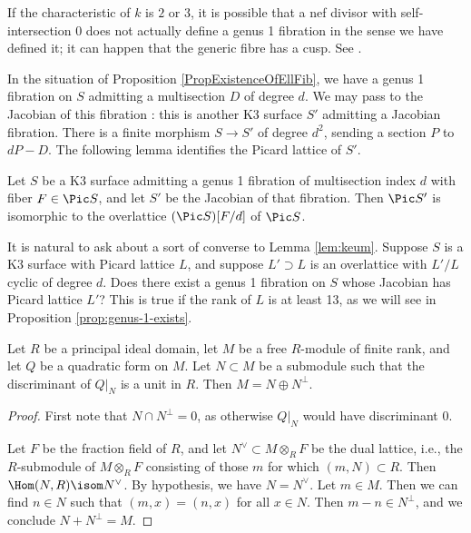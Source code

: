 \documentclass{article}
\begin{document}
\begin{rmk}\label{rem:char-p-bad} If the characteristic of $k$ is $2$ or $3$, it is possible that a nef divisor with self-intersection $0$ does not actually define a genus 1 fibration in the sense we have defined it; it can happen that the generic fibre has a cusp.  See \cite[proof of Proposition 2.3.10]{huybrechts}.  
\end{rmk}





In the situation of Proposition \ref{PropExistenceOfEllFib},  we have a genus 1 fibration on $S$ admitting a multisection $D$ of degree $d$.  We may pass to the Jacobian of this fibration \cite[Chapter 11, \S 4]{huybrechts}:  this is another K3 surface $S'$ admitting a Jacobian fibration.  There is a finite morphism $S\to S'$ of degree $d^2$, sending a section $P$ to $dP-D$.   The following lemma identifies the Picard lattice of $S'$.  


\begin{lm}\label{lem:keum} Let $S$ be a K3 surface admitting a genus 1 fibration of multisection index $d$ with fiber $F\in \Pic S$, and let $S'$ be the Jacobian of that fibration.   Then  $\Pic S'$ is isomorphic to the overlattice $(\Pic S)[F/d]$ of $\Pic S$.  
\end{lm}

It is natural to ask about a sort of converse to Lemma \ref{lem:keum}.  Suppose $S$ is a K3 surface with Picard lattice $L$, and suppose $L'\supset L$ is an overlattice with $L'/L$ cyclic of degree $d$.   Does there exist a genus 1 fibration on $S$ whose Jacobian has Picard lattice $L'$?  This is true if the rank of $L$ is at least 13, as we will see in Proposition \ref{prop:genus-1-exists}.

\begin{lm}\label{lem:split-quad} Let $R$ be a principal ideal domain, let $M$ be a free $R$-module of finite rank, and let $Q$ be a quadratic form on $M$.  Let $N\subset M$ be a submodule such that the discriminant of $Q|_N$ is a unit in $R$.  Then
  $M = N \oplus N^{\perp}$.
\end{lm}

\begin{proof}
  First note that $N \cap N^\perp = 0$, as otherwise $Q|_N$ would
  have discriminant $0$.  
  
  Let $F$ be the fraction field of $R$, and let $N^\vee\subset M\otimes_R F$ be the dual lattice, i.e., the $R$-submodule of $M\otimes_R F$ consisting of those $m$ for which $(m,N)\subset R$.  Then $\Hom(N,R)\isom N^\vee$.   By hypothesis, we have $N = N^\vee$.  Let $m\in M$.   Then we can find $n\in N$ such that $(m,x)=(n,x)$ for all $x\in N$.  Then $m-n\in N^\perp$, and we conclude $N+N^\perp=M$.
\end{proof}
\end{document}
